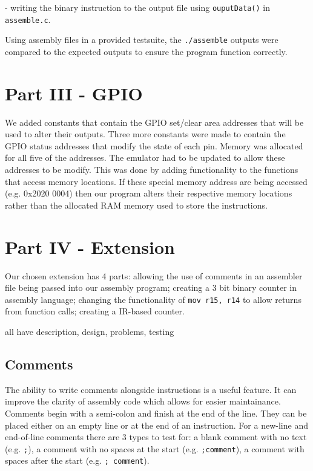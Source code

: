 \documentclass[11pt]{article}
\begin{document}
- writing the binary instruction to the output file using \verb|ouputData()| in \texttt{assemble.c}.\newline

Using assembly files in a provided testsuite, the \texttt{./assemble} outputs were compared to the expected outputs to ensure the program function correctly.
\section{Part III - GPIO}

We added constants that contain the GPIO set/clear area addresses that will be used to alter their outputs. Three more constants were made to contain the GPIO status addresses that modify the state of each pin.  Memory was allocated for all five of the addresses. The emulator had to be updated to allow these addresses to be modify. This was done by adding functionality to the functions that access memory locations. If these special memory address are being accessed (e.g. 0x2020 0004) then our program alters their respective memory locations rather than the allocated RAM memory used to store the instructions.

\section{Part IV - Extension}
Our chosen extension has 4 parts: allowing the use of comments in an assembler file being passed into our assembly program; creating a 3 bit binary counter in assembly language; changing the functionality of \texttt{mov r15, r14} to allow returns from function calls; creating a IR-based counter. \newline 

  \noindent all have description, design, problems, testing
  
\subsection{Comments}
The ability to write comments alongside instructions is a useful feature. It can improve the clarity of assembly code which allows for easier maintainance. Comments begin with a semi-colon and finish at the end of the line. They can be placed either on an empty line or at the end of an instruction. For a new-line and end-of-line comments there are 3 types to test for: a blank comment with no text (e.g. \texttt{;}), a comment with no spaces at the start (e.g. \texttt{;comment}), a comment with spaces after the start (e.g. \texttt{; comment}).\newline
\end{document}

